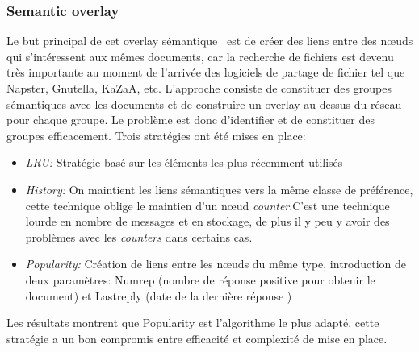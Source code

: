 		\subsubsection{Semantic overlay}
			Le but principal de cet overlay sémantique~\cite{999375} est de créer des liens entre des nœuds qui s'intéressent aux mêmes documents, car la recherche de fichiers est devenu très importante au moment de l'arrivée des logiciels de partage de fichier tel que Napster, Gnutella, KaZaA, etc. L'approche consiste de constituer des groupes sémantiques avec les documents et de construire un overlay au dessus du réseau pour chaque groupe. Le problème est donc d'identifier et de constituer des groupes efficacement. Trois stratégies ont été mises en place:
		\begin{itemize}
		\renewcommand{\labelitemi}{$\bullet$}
                	\item \textit{LRU:} Stratégie basé sur les éléments les plus récemment utilisés
                	\item \textit{History:} On maintient les liens sémantiques vers la même classe de préférence, cette technique oblige le maintien d'un nœud \textit{counter}.C'est une technique lourde en nombre de messages et en stockage, de plus il y peu y avoir des problèmes avec les \textit{counters} dans certains cas.
	                \item \textit{Popularity:} Création de liens entre les nœuds du même type, introduction de deux paramètres: Numrep (nombre de réponse positive pour obtenir le document) et Lastreply (date de la dernière réponse )
        	\end{itemize}
	        Les résultats montrent que Popularity est l'algorithme le plus adapté, cette stratégie a un bon compromis entre efficacité et complexité de mise en place.

